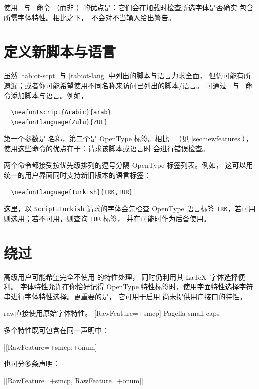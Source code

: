 \documentclass[a4paper]{l3doc}
\begin{document}
使用 \cmd\newAATfeature\ 与 \cmd\newopentypefeature\ 命令
（而非 ）的优点是：它们会在加载时检查所选字体是否确实
包含所需字体特性。相比之下，\cmd\newfontfeature\ 不会对不当输入给出警告。


\section{定义新脚本与语言}
\label{sec:newscriptlang}

\DescribeMacro{\newfontscript}
\DescribeMacro{\newfontlanguage}
虽然 \ref{tab:ot-scpt} 与 \ref{tab:ot-lang} 中列出的脚本与语言力求全面，
但仍可能有所遗漏；或者你可能希望使用不同名称来访问已列出的脚本/语言。
可通过 \cmd\newfontscript\ 与 \cmd\newfontlanguage\ 命令添加脚本与语言。例如，
\begin{Verbatim}
  \newfontscript{Arabic}{arab}
  \newfontlanguage{Zulu}{ZUL}
\end{Verbatim}
第一个参数是  名称，第二个是 OpenType 标签。相比 \cmd\newfontfeature\
（见 \vref{sec:newfeatures}），使用这些命令的优点在于：请求该脚本或语言时
会进行错误检查。

两个命令都接受按优先级排列的逗号分隔 OpenType 标签列表。例如，
这可以用统一的用户界面同时支持新旧版本的语言标签：
\begin{Verbatim}
  \newfontlanguage{Turkish}{TRK,TUR}
\end{Verbatim}
这里，以 \verb|Script=Turkish| 请求的字体会先检查 OpenType 语言标签
\verb|TRK|，若可用则选用；若不可用，则查询 \verb|TUR| 标签，
并在可能时作为后备使用。


\section{绕过 }

高级用户可能希望完全不使用  的特性处理，
同时仍利用其 \LaTeX\ 字体选择便利。 字体特性允许在你恰好记得
OpenType 特性标签时，使用字面特性选择字符串进行字体特性选择。更重要的是，
它可用于启用  尚未提供用户接口的特性。

\begin{Xexample}{raw}{直接使用原始字体特性。}
  [RawFeature=+smcp]
  Pagella small caps
\end{Xexample}

多个特性既可包含在同一声明中：\par
{\centering|[RawFeature=+smcp;+onum]|\par}
\noindent 也可分多条声明：\par
{\centering|[RawFeature=+smcp, RawFeature=+onum]|\par}
\end{document}
